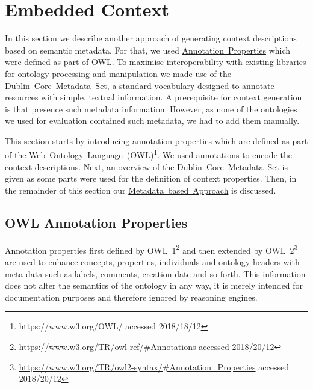 \section{Embedded Context}\label{sec:embedded_context}
In this section we describe another approach of generating context descriptions based on semantic metadata. For that, we used \hyperref[sec:OWL_annotation_properties]{Annotation~Properties} which were defined as part of OWL. To maximise interoperability with existing libraries for ontology processing and manipulation we made use of the \hyperref[sec:dublin_core_metadata_vocabulary]{Dublin~Core~Metadata~Set}, a standard vocabulary designed to annotate resources with simple, textual information. A prerequisite for context generation is that presence such metadata information. However, as none of the ontologies we used for evaluation contained such metadata, we had to add them manually. 

This section starts by introducing annotation properties which are defined as part of the \hyperref[sec:OWL_annotation_properties]{Web~Ontology~Language~(OWL)\footnote{\url{https://www.w3.org/OWL/} accessed 2018/18/12}}. We used annotations to encode the context descriptions. Next, an overview of the \hyperref[sec:dublin_core_metadata_vocabulary]{Dublin~Core~Metadata~Set} is given as some parts were used for the definition of context properties. Then, in the remainder of this section our \hyperref[sec:enrichment_metaData_approach]{Metadata~based~Approach} is discussed.

\subsection{OWL Annotation Properties}\label{sec:OWL_annotation_properties}
Annotation properties first defined by OWL~1\footnote{\url{https://www.w3.org/TR/owl-ref/\#Annotations} accessed 2018/20/12} and then extended by OWL~2\footnote{\url{https://www.w3.org/TR/owl2-syntax/\#Annotation_Properties} accessed 2018/20/12} are used to enhance concepts, properties, individuals and ontology headers with meta data such as labels, comments, creation date and so forth. This information does not alter the semantics of the ontology in any way, it is merely intended for documentation purposes and therefore ignored by reasoning engines. 

